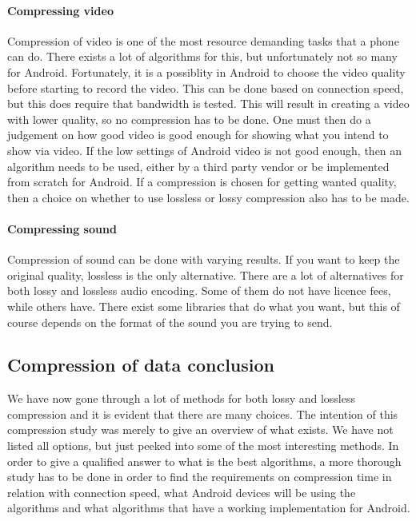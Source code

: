 \newpage

\paragraph{Compressing video} \hfill
\newline
Compression of video is one of the most resource demanding tasks that a phone can do. There exists a lot of algorithms for this, but unfortunately not so many for Android. Fortunately, it is a possiblity in Android to choose the video quality before starting to record the video. This can be done based on connection speed, but this does require that bandwidth is tested. This will result in creating a video with lower quality, so no compression has to be done. One must then do a judgement on how good video is good enough for showing what you intend to show via video. If the low settings of Android video is not good enough, then an algorithm needs to be used, either by a third party vendor or be implemented from scratch for Android. If a compression is chosen for getting wanted quality, then a choice on whether to use lossless or lossy compression also has to be made.

\paragraph{Compressing sound}\hfill
\newline
Compression of sound can be done with varying results. If you want to keep the original quality, lossless is the only alternative. There are a lot of alternatives for both lossy and lossless audio encoding. Some of them do not have licence fees, while others have. There exist some libraries that do what you want, but this of course depends on the format of the sound you are trying to send.

\subsection{Compression of data conclusion}
We have now gone through a lot of methods for both lossy and lossless compression and it is evident that there are many choices. The intention of this compression study was merely to give an overview of what exists. We have not listed all options, but just peeked into some of the most interesting methods. In order to give a qualified answer to what is the best algorithms, a more thorough study has to be done in order to find the requirements on compression time in relation with connection speed, what Android devices will be using the algorithms and what algorithms that have a working implementation for Android.  







